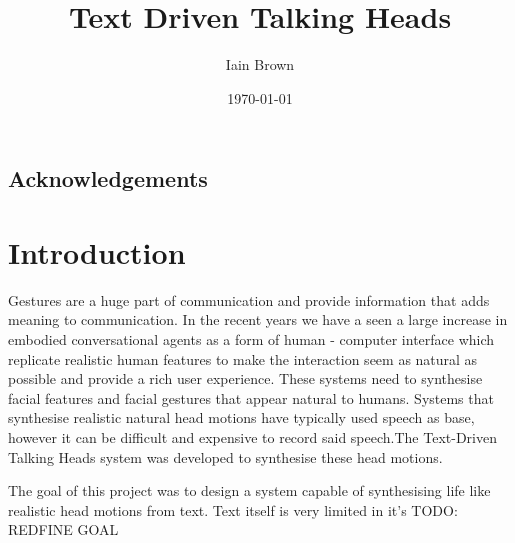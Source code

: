 \documentclass[bsc,frontabs,twoside,singlespacing,parskip,deptreport]{infthesis}
\begin{document}
\title{Text Driven Talking Heads}
\author{Iain Brown}

\date{\today}

\maketitle
\section*{Acknowledgements}
\tableofcontents

\chapter{Introduction}

Gestures are a huge part of communication \cite{kendon} and provide information that adds meaning to communication. In the recent years we have a seen a large increase in embodied conversational agents as a form of human - computer interface which replicate realistic human features to make the interaction seem as natural as possible and provide a rich user experience. These systems need to synthesise facial features and facial gestures that appear natural to humans. Systems that synthesise realistic natural head motions have typically used speech as base, however it can be difficult and expensive to record said speech.The Text-Driven Talking Heads system was developed to synthesise these head motions. 

The goal of this project was to design a system capable of synthesising life like realistic head motions from text. Text itself is very limited in it's 
 TODO: REDFINE GOAL
\end{document}

